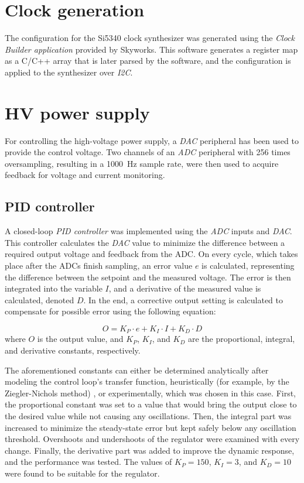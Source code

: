 \section{Clock generation}
The configuration for the Si5340 clock synthesizer was generated using the \emph{Clock Builder application} provided by Skyworks. This software generates a register map as a C/C++ array that is later parsed by the software, and the configuration is applied to the synthesizer over \emph{I2C}.

\section{HV power supply}
For controlling the high-voltage power supply, a \emph{DAC} peripheral has been used to provide the control voltage. Two channels of an \emph{ADC} peripheral with 256 times oversampling, resulting in a \SI{1000}{\hertz} sample rate, were then used to acquire feedback for voltage and current monitoring. 

\subsection{PID controller}
A closed-loop \emph{PID controller} was implemented using the \emph{ADC} inputs and \emph{DAC}. This controller calculates the \emph{DAC} value to minimize the difference between a required output voltage and feedback from the ADC. On every cycle, which takes place after the ADCs finish sampling, an error value $e$ is calculated, representing the difference between the setpoint and the measured voltage. The error is then integrated into the variable $I$, and a derivative of the measured value is calculated, denoted $D$. In the end, a corrective output setting is calculated to compensate for possible error using the following equation: \cite{ogata2010modern}

\begin{equation}
    O = K_P \cdot e + K_I \cdot I + K_D \cdot D
\end{equation}
where $O$ is the output value, and $K_P$, $K_I$, and $K_D$ are the proportional, integral, and derivative constants, respectively.

The aforementioned constants can either be determined analytically after modeling the control loop's transfer function, heuristically (for example, by the Ziegler-Nichols method) \cite{ogata2010modern}, or experimentally, which was chosen in this case. First, the proportional constant was set to a value that would bring the output close to the desired value while not causing any oscillations. Then, the integral part was increased to minimize the steady-state error but kept safely below any oscillation threshold. Overshoots and undershoots of the regulator were examined with every change. Finally, the derivative part was added to improve the dynamic response, and the performance was tested. The values of $K_P = 150$, $K_I = 3$, and $K_D = 10$ were found to be suitable for the regulator.
